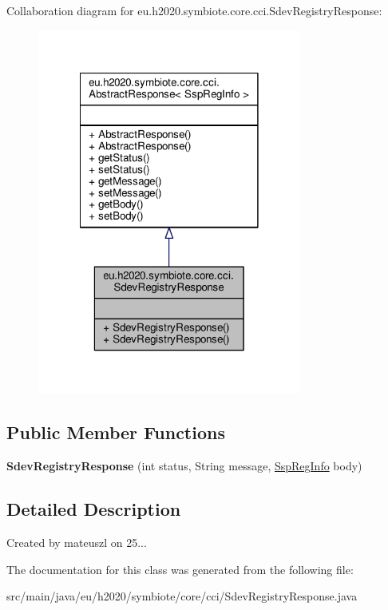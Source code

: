 Collaboration diagram for eu.\+h2020.\+symbiote.\+core.\+cci.\+Sdev\+Registry\+Response\+:\nopagebreak
\begin{figure}[H]
\begin{center}
\leavevmode
\includegraphics[width=246pt]{classeu_1_1h2020_1_1symbiote_1_1core_1_1cci_1_1SdevRegistryResponse__coll__graph}
\end{center}
\end{figure}
\subsection*{Public Member Functions}
\begin{DoxyCompactItemize}
\item 
\mbox{\label{classeu_1_1h2020_1_1symbiote_1_1core_1_1cci_1_1SdevRegistryResponse_a5f143c87715676885be9d100dd35091a}} 
{\bfseries Sdev\+Registry\+Response} (int status, String message, \hyperlink{classeu_1_1h2020_1_1symbiote_1_1cloud_1_1model_1_1ssp_1_1SspRegInfo}{Ssp\+Reg\+Info} body)
\end{DoxyCompactItemize}


\subsection{Detailed Description}
Created by mateuszl on 25... 

The documentation for this class was generated from the following file\+:\begin{DoxyCompactItemize}
\item 
src/main/java/eu/h2020/symbiote/core/cci/Sdev\+Registry\+Response.\+java\end{DoxyCompactItemize}
